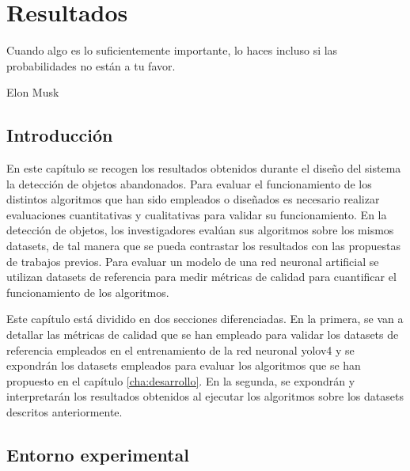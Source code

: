 
\chapter{Resultados}
\label{cha:resultados}

\begin{FraseCelebre}
  \begin{Frase}
    Cuando algo es lo suficientemente importante, lo haces incluso si las probabilidades no están a tu favor.
  \end{Frase}
  \begin{Fuente}
    Elon Musk
  \end{Fuente}
\end{FraseCelebre}

\section{Introducción}
\label{sec:intro-resultados}

En este capítulo se recogen los resultados obtenidos durante el diseño del sistema la detección de objetos abandonados. Para evaluar el funcionamiento de los distintos algoritmos que han sido empleados o diseñados es necesario realizar evaluaciones cuantitativas y cualitativas para validar su funcionamiento. En la detección de objetos, los investigadores evalúan sus algoritmos sobre los mismos datasets, de tal manera que se pueda contrastar los resultados con las propuestas de trabajos previos. Para evaluar un modelo de una red neuronal artificial se utilizan datasets de referencia para medir métricas de calidad para cuantificar el funcionamiento de los algoritmos.

Este capítulo está dividido en dos secciones diferenciadas. En la primera, se van a detallar las métricas de calidad que se han empleado para validar los datasets de referencia empleados en el entrenamiento de la red neuronal \gls{yolov4} y se expondrán los datasets empleados para evaluar los algoritmos que se han propuesto en el capítulo \ref{cha:desarrollo}. En la segunda, se expondrán y interpretarán los resultados obtenidos al ejecutar los algoritmos sobre los datasets descritos anteriormente.

\section{Entorno experimental}
\label{sec:desarrollo-resultados}

